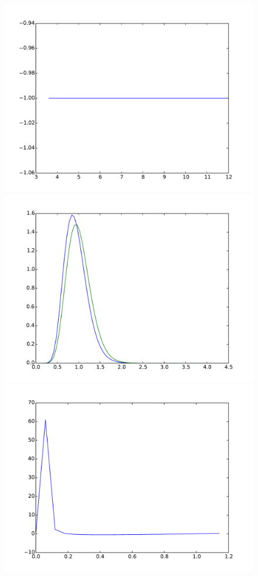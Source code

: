 \documentclass{article}
\begin{document}
\begin{figure}[htb]
\begin{minipage}{.3\textwidth}
		\includegraphics[width=0.97\linewidth]{bootstrap-filter/relative_tail_complex_1_3.pdf}
	\end{minipage}
	\begin{minipage}{.3\textwidth}
		\centering
		\includegraphics[width=0.97\linewidth]{bootstrap-filter/global_complex_4_3.pdf}
	\end{minipage}
	\begin{minipage}{.3\textwidth}
		\centering
		\includegraphics[width=0.97\linewidth]{bootstrap-filter/relative_beginning_complex_4_3.pdf}

\end{minipage}
\end{figure}
\end{document}
